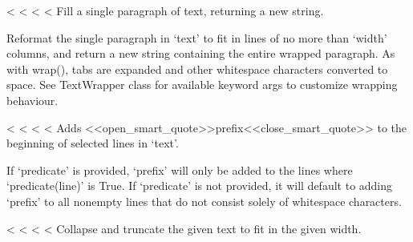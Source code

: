 \documentclass[letterpaper,10pt,english]{sphinxmanual}
\begin{document}
\begin{savenotes}
{{\begin{savenotes}
{{\begin{savenotes}
{{\begin{savenotes}
{{\begin{fulllineitems}
\label{\detokenize{index:textwrap.fill}}
<%
\pysigstartsignatures
<%
<%
<%
Fill a single paragraph of text, returning a new string.

Reformat the single paragraph in ‘text’ to fit in lines of no more
than ‘width’ columns, and return a new string containing the entire
wrapped paragraph.  As with wrap(), tabs are expanded and other
whitespace characters converted to space.  See TextWrapper class for
available keyword args to customize wrapping behaviour.

\end{fulllineitems}


\begin{fulllineitems}
\label{\detokenize{index:textwrap.indent}}
<%
\pysigstartsignatures
<%
<%
<%
Adds <<open_smart_quote>>prefix<<close_smart_quote>> to the beginning of selected lines in ‘text’.

If ‘predicate’ is provided, ‘prefix’ will only be added to the lines
where ‘predicate(line)’ is True. If ‘predicate’ is not provided,
it will default to adding ‘prefix’ to all non\sphinxhyphen{}empty lines that do not
consist solely of whitespace characters.

\end{fulllineitems}


\begin{fulllineitems}
\label{\detokenize{index:textwrap.shorten}}
<%
\pysigstartsignatures
<%
<%
<%
Collapse and truncate the given text to fit in the given width.


\end{fulllineitems}}}
\end{savenotes}}}
\end{savenotes}}}
\end{savenotes}}}
\end{savenotes}
\end{document}
